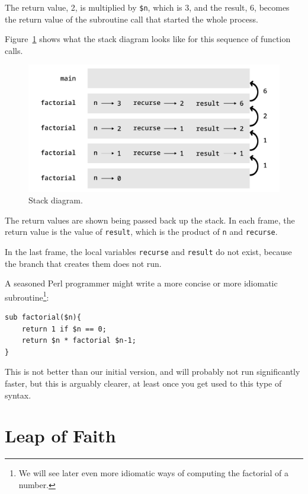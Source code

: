 The return value, 2, is multiplied by \verb'$n', which is 3, and 
the result, 6, becomes the return value of the subroutine call 
that started the whole process.

Figure~\ref{fig.stack3} shows what the stack diagram looks like for
this sequence of function calls.

\begin{figure}
\centerline
{\includegraphics[scale=0.8]{figs/stack3.pdf}}
\caption{Stack diagram.}
\label{fig.stack3}
\end{figure}

The return values are shown being passed back up the stack.  In each
frame, the return value is the value of {\tt result}, which is the
product of {\tt n} and {\tt recurse}.

In the last frame, the local
variables {\tt recurse} and {\tt result} do not exist, because
the branch that creates them does not run.

A seasoned Perl programmer might write a more concise or
more idiomatic subroutine\footnote{We will see later even 
more idiomatic ways of computing the factorial of a number.}:

\begin{verbatim}
sub factorial($n){
    return 1 if $n == 0;
    return $n * factorial $n-1;
}
\end{verbatim}
%
This is not better than our initial version, and will probably 
not run significantly faster, but this is arguably clearer, 
at least once you get used to this type of syntax.

\section{Leap of Faith}

